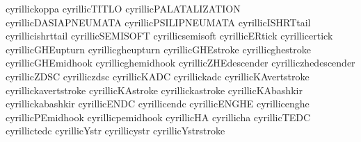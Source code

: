  cyrillickoppa              {}
 cyrillicTITLO              {}
 cyrillicPALATALIZATION     {}
 cyrillicDASIAPNEUMATA      {}
 cyrillicPSILIPNEUMATA      {}
 cyrillicISHRTtail          {}
 cyrillicishrttail          {}
 cyrillicSEMISOFT           {}
 cyrillicsemisoft           {}
 cyrillicERtick             {}
 cyrillicertick             {}
 cyrillicGHEupturn          {}
 cyrillicgheupturn          {}
 cyrillicGHEstroke          {}
 cyrillicghestroke          {}
 cyrillicGHEmidhook         {}
 cyrillicghemidhook         {}
 cyrillicZHEdescender       {}
 cyrilliczhedescender       {}
 cyrillicZDSC               {}
 cyrilliczdsc               {}
 cyrillicKADC               {}
 cyrillickadc               {}
 cyrillicKAvertstroke       {}
 cyrillickavertstroke       {}
 cyrillicKAstroke           {}
 cyrillickastroke           {}
 cyrillicKAbashkir          {}
 cyrillickabashkir          {}
 cyrillicENDC               {}
 cyrillicendc               {}
 cyrillicENGHE              {}
 cyrillicenghe              {}
 cyrillicPEmidhook          {}
 cyrillicpemidhook          {}
 cyrillicHA                 {}
 cyrillicha                 {}
 cyrillicTEDC               {}
 cyrillictedc               {}
 cyrillicYstr               {}
 cyrillicystr               {}
 cyrillicYstrstroke         {}
